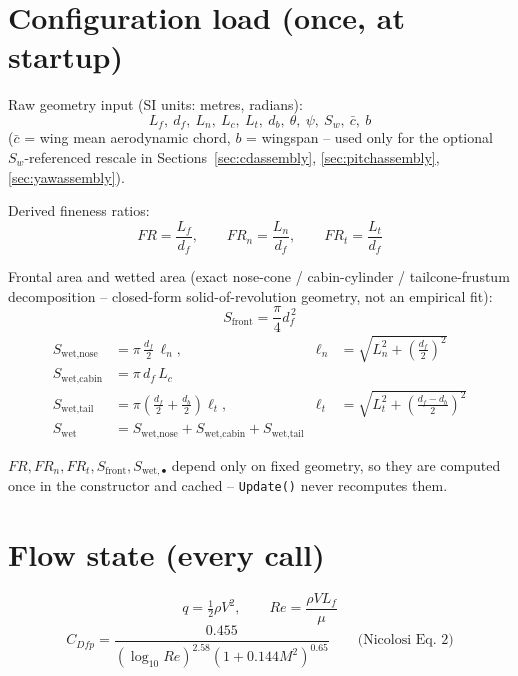 \documentclass[11pt]{article}
\begin{document}
\section{Configuration load (once, at startup)}

Raw geometry input (SI units: metres, radians):
\begin{equation}
L_f,\ d_f,\ L_n,\ L_c,\ L_t,\ d_b,\ \theta,\ \psi,\ S_w,\ \bar{c},\ b
\end{equation}
($\bar c$ = wing mean aerodynamic chord, $b$ = wingspan -- used only for
the optional $S_w$-referenced rescale in Sections~\ref{sec:cdassembly},
\ref{sec:pitchassembly}, \ref{sec:yawassembly}).

Derived fineness ratios:
\begin{equation}
FR = \frac{L_f}{d_f}, \qquad FR_n = \frac{L_n}{d_f}, \qquad FR_t = \frac{L_t}{d_f}
\end{equation}

Frontal area and wetted area (exact nose-cone / cabin-cylinder /
tailcone-frustum decomposition -- closed-form solid-of-revolution
geometry, not an empirical fit):
\begin{equation}
S_{\text{front}} = \frac{\pi}{4}d_f^{\,2}
\end{equation}
\begin{align}
S_{\text{wet,nose}} &= \pi\,\frac{d_f}{2}\,\ell_n, & \ell_n &= \sqrt{L_n^2+\left(\tfrac{d_f}{2}\right)^2} \\
S_{\text{wet,cabin}} &= \pi\,d_f\,L_c \\
S_{\text{wet,tail}} &= \pi\left(\tfrac{d_f}{2}+\tfrac{d_b}{2}\right)\ell_t, & \ell_t &= \sqrt{L_t^2+\left(\tfrac{d_f-d_b}{2}\right)^2} \\
S_{\text{wet}} &= S_{\text{wet,nose}}+S_{\text{wet,cabin}}+S_{\text{wet,tail}}
\end{align}

$FR,FR_n,FR_t,S_{\text{front}},S_{\text{wet},\bullet}$ depend only on
fixed geometry, so they are computed once in the constructor and
cached -- \texttt{Update()} never recomputes them.

\section{Flow state (every call)}

\begin{equation}
q=\tfrac12\rho V^2, \qquad Re=\frac{\rho V L_f}{\mu}
\end{equation}
\begin{equation}
C_{Dfp} = \frac{0.455}{\left(\log_{10}Re\right)^{2.58}\left(1+0.144M^2\right)^{0.65}}
\qquad\text{(Nicolosi Eq.~2)}
\end{equation}
\end{document}
